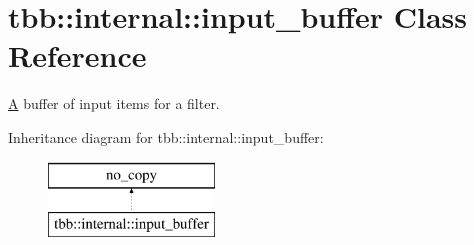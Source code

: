 \hypertarget{classtbb_1_1internal_1_1input__buffer}{}\section{tbb\+:\+:internal\+:\+:input\+\_\+buffer Class Reference}
\label{classtbb_1_1internal_1_1input__buffer}


\hyperlink{structA}{A} buffer of input items for a filter.  


Inheritance diagram for tbb\+:\+:internal\+:\+:input\+\_\+buffer\+:\begin{figure}[H]
\begin{center}
\leavevmode
\includegraphics[height=2.000000cm]{classtbb_1_1internal_1_1input__buffer}
\end{center}
\end{figure}
